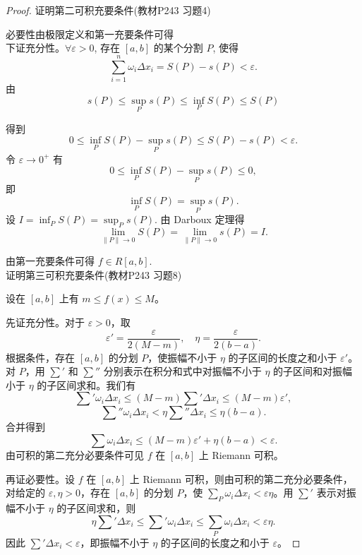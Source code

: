 \documentclass[lang=cn,12pt]{elegantbook}
\begin{document}
\begin{proof}
    证明第二可积充要条件(教材P243 习题4)

    必要性由极限定义和第一充要条件可得\\
    下证充分性。$\forall \varepsilon > 0$, 存在 $[a, b]$ 的某个分割 $P$, 使得
    \[
    \sum_{i=1}^n \omega_i \Delta x_i  = S(P) - s(P) < \varepsilon.
    \]
    由
    \[
    s(P) \leq \sup_P s(P) \leq \inf_P S(P) \leq S(P)
    \]

    得到
    \[
    0 \leq \inf_P S(P)  - \sup_P s(P) \leq S(P) - s(P) < \varepsilon.
    \]
    令 $\varepsilon \to 0^+$ 有
    \[
    0 \leq \inf_P S(P) - \sup_P s(P) \leq 0,
    \]
    即
    \[
    \inf_P S(P) = \sup_P s(P).
    \]
    设 $I = \inf_P S(P) = \sup_P s(P)$. 由 Darboux 定理得
    \[
    \lim_{\|P\| \to 0} S(P) = \lim_{\|P\| \to 0} s(P) = I.
    \]

    由第一充要条件可得 $f \in R[a, b]$.\\


    证明第三可积充要条件(教材P243 习题8)

    设在 \([a,b]\) 上有 \( m \leq f(x) \leq M \)。

先证充分性。对于 \(\varepsilon > 0\)，取
\[
\varepsilon' = \frac{\varepsilon}{2(M - m)}, \quad \eta = \frac{\varepsilon}{2(b - a)}.
\]
根据条件，存在 \([a,b]\) 的分划 \( P \)，使振幅不小于 \(\eta\) 的子区间的长度之和小于 \(\varepsilon'\)。对 \( P \)，用 \(\sum'\) 和 \(\sum''\) 分别表示在积分和式中对振幅不小于 \(\eta\) 的子区间和对振幅小于 \(\eta\) 的子区间求和。我们有
\[
\sum' \omega_i \Delta x_i \leq (M - m) \sum' \Delta x_i \leq (M - m)\varepsilon',
\]
\[
\sum'' \omega_i \Delta x_i < \eta \sum'' \Delta x_i \leq \eta(b - a).
\]
合并得到
\[
\sum \omega_i \Delta x_i \leq (M - m)\varepsilon' + \eta(b - a) < \varepsilon.
\]
由可积的第二充分必要条件可见 \( f \) 在 \([a,b]\) 上 Riemann 可积。

再证必要性。设 \( f \) 在 \([a,b]\) 上 Riemann 可积，则由可积的第二充分必要条件，对给定的 \(\varepsilon, \eta > 0\)，存在 \([a,b]\) 的分划 \( P \)，使 \(\sum_{P} \omega_i \Delta x_i < \varepsilon\eta\)。用 \(\sum'\) 表示对振幅不小于 \(\eta\) 的子区间求和，则
\[
\eta \sum' \Delta x_i \leq \sum' \omega_i \Delta x_i \leq  \sum_{P} \omega_i \Delta x_i < \varepsilon\eta.
\]
因此 \(\sum' \Delta x_i < \varepsilon\)，即振幅不小于 \(\eta\) 的子区间的长度之和小于 \(\varepsilon\)。
\end{proof}

\end{document}
